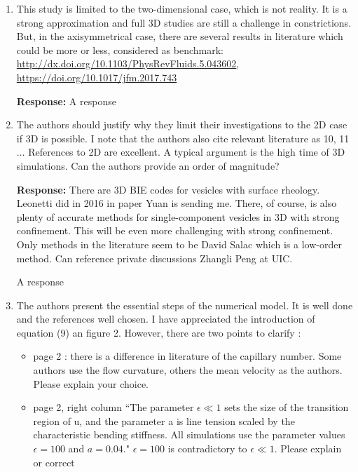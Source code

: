 \documentclass[11pt]{article}
\begin{document}
\begin{enumerate}
\item This study is limited to the two-dimensional case, which is not
  reality. It is a strong approximation and full 3D studies are still a
    challenge in constrictions. But, in the axisymmetrical case, there
    are several results in literature which could be more or less,
    considered as benchmark:
    \url{http://dx.doi.org/10.1103/PhysRevFluids.5.043602}, \\
    \url{https://doi.org/10.1017/jfm.2017.743}

\noindent
{\bf Response:} A response

\item The authors should justify why they limit their investigations to
  the 2D case if 3D is possible. I note that the authors also cite
    relevant literature as 10, 11 $\ldots$ References to 2D are
    excellent. A typical argument is the high time of 3D simulations.
    Can the authors provide an order of magnitude?

\noindent
{\bf Response:} There are 3D BIE codes for vesicles with surface
    rheology. Leonetti did in 2016 in paper Yuan is sending me. There,
    of course, is also plenty of accurate methods for single-component
    vesicles in 3D with strong confinement. This will be even more
    challenging with strong confinement. Only methods in the literature
    seem to be David Salac which is a low-order method. Can reference
    private discussions Zhangli Peng at UIC.


    A response

\item The authors present the essential steps of the numerical model. It
  is well done and the references well chosen. I have appreciated the
    introduction of equation (9) an figure 2. However, there are two
    points to clarify :
    \begin{itemize}
      \item page 2 : there is a difference in literature of the
        capillary number. Some authors use the flow curvature, others
        the mean velocity as the authors. Please explain your choice.
      \item page 2, right column ``The parameter $\epsilon \ll 1$ sets
        the size of the transition region of u, and the parameter a is
        line tension scaled by the characteristic bending stiffness. All
        simulations use the parameter values $\epsilon = 100$ and $a =
        0.04.$" $\epsilon = 100$ is contradictory to $\epsilon \ll 1$.
        Please explain or correct
    \end{itemize}


\end{enumerate}
\end{document}
